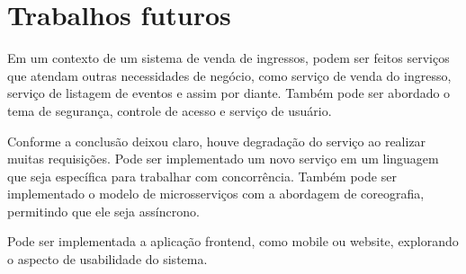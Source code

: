 
\chapter*[Trabalhos futuros]{Trabalhos futuros}\label{trabalhos-futuros}




Em um contexto de um sistema de venda de ingressos, podem ser feitos serviços que atendam
outras necessidades de negócio, como serviço de venda do ingresso, serviço de listagem de eventos
e assim por diante.
Também pode ser abordado o tema de segurança, controle de acesso e serviço de usuário.

Conforme a conclusão deixou claro, houve degradação do serviço ao realizar muitas requisições.
Pode ser implementado um novo serviço em um linguagem que seja específica para trabalhar
com concorrência.
Também pode ser implementado o modelo de microsserviços com a abordagem de coreografia,
permitindo que ele seja assíncrono.

Pode ser implementada a aplicação frontend, como mobile ou website,
explorando o aspecto de usabilidade do sistema.

